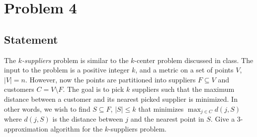 \documentclass[a4paper]{article}
\begin{document}
\section{Problem 4}
\subsection{Statement}
The \emph{$k$-suppliers} problem is similar to the $k$-center problem discussed in class. The input to the problem is a positive integer $k$, and a metric on a set of points $V$, $|V| = n$. However,
now the points are partitioned into suppliers $F \subseteq V$ and customers $C = V \setminus F$. The goal is to pick $k$ suppliers such that the maximum distance between a customer and its nearest picked
supplier is minimized. In other words, we wish to find $S \subseteq F$, $|S| \le k$ that minimizes $\max_{j \in C} d(j, S)$ where $d(j, S)$ is the distance between $j$ and the nearest point in $S$.
Give a $3$-approximation algorithm for the $k$-suppliers problem.
\end{document}
